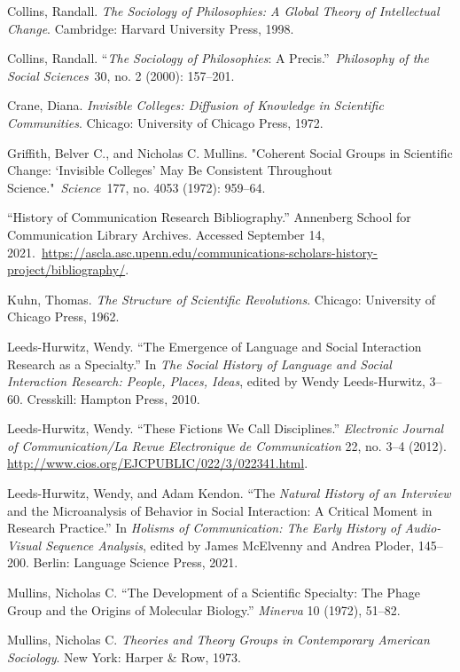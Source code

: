 \documentclass{tufte-handout}
\begin{document}
\begin{hangparas}{.25in}{1} 



Collins, Randall. \emph{The Sociology of Philosophies: A Global Theory
of Intellectual Change}. Cambridge: Harvard University Press, 1998.

Collins, Randall. ``\emph{The Sociology of Philosophies}: A
Precis.''~\emph{Philosophy of the Social Sciences}~30, no. 2 (2000):
157--201.

Crane, Diana. \emph{Invisible Colleges: Diffusion of Knowledge in
Scientific Communities}. Chicago: University of Chicago Press, 1972.

Griffith, Belver C., and Nicholas C. Mullins. "Coherent Social Groups in
Scientific Change: `Invisible Colleges' May Be Consistent Throughout
Science."~\emph{Science}~177, no. 4053 (1972): 959--64.

``History of Communication Research Bibliography.'' Annenberg School for
Communication Library Archives. Accessed September 14,
2021.~\href{https://ascla.asc.upenn.edu/communications-scholars-history-project/bibliography/}{https://ascla.asc.upenn.edu/communications-scholars-history-project/bibliography/}.

Kuhn, Thomas. \emph{The Structure of Scientific Revolutions}. Chicago:
University of Chicago Press, 1962.

Leeds-Hurwitz, Wendy. ``The Emergence of Language and Social Interaction
Research as a Specialty.'' In \emph{The Social History of Language and
Social Interaction Research: People, Places, Ideas}, edited by Wendy
Leeds-Hurwitz, 3--60. Cresskill: Hampton Press, 2010.

Leeds-Hurwitz, Wendy. ``These Fictions We Call Disciplines.''
\emph{Electronic Journal of Communication/La Revue Electronique de
Communication} 22, no. 3--4 (2012).
\url{http://www.cios.org/EJCPUBLIC/022/3/022341.html}.

Leeds-Hurwitz, Wendy, and Adam Kendon. ``The \emph{Natural History of an
Interview} and the Microanalysis of Behavior in Social Interaction: A
Critical Moment in Research Practice.'' In \emph{Holisms of
Communication: The Early History of Audio-Visual Sequence Analysis},
edited by James McElvenny and Andrea Ploder, 145--200. Berlin: Language
Science Press, 2021.

Mullins, Nicholas C. ``The Development of a Scientific Specialty: The
Phage Group and the Origins of Molecular Biology.'' \emph{Minerva} 10
(1972), 51--82.

Mullins, Nicholas C. \emph{Theories and Theory Groups in Contemporary
American Sociology}. New York: Harper \& Row, 1973.


\end{hangparas}
\end{document}
